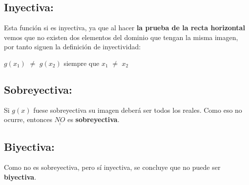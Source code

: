 \documentclass[12pt]{article}
\def\doubleunderline#1{\underline{\underline{#1}}}
\begin{document}
\subsection*{{\textcolor{Lochinvar}{\bfseries{Inyectiva}:}}} Esta función si es inyectiva, ya que al hacer {\bfseries{la prueba de la recta horizontal}} vemos que no existen dos elementos del dominio que tengan la misma imagen, por tanto siguen la definición de inyectividad: \vspace{0.5cm}

\hspace{4cm} $g(x_{1})$ $\neq$ $g(x_{2})$ siempre que $x_{1}$ $\neq$ $x_{2}$ \vspace{0.5cm}

\subsection*{{\textcolor{Lochinvar}{\bfseries{Sobreyectiva}:}}} Si $g(x)$ fuese sobreyectiva su imagen deberá ser todos los reales. Como eso no ocurre, entonces {$\doubleunderline{NO}$} es {\bfseries{sobreyectiva}}. \vspace{0.5cm}

\subsection*{{\textcolor{Lochinvar}{\bfseries{Biyectiva}:}}} Como no es sobreyectiva, pero sí inyectiva, se concluye que no puede ser {\bfseries{biyectiva}}. \vspace{0.5cm}
\end{document}
